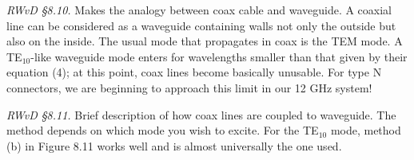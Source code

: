 \documentclass[11pt,preprint]{aastex}
\begin{document}
{\it RWvD \S 8.10.} Makes the analogy between coax cable and waveguide.
A coaxial line can be considered as a waveguide containing walls not
only the outside but also on the inside.  The usual mode that propagates
in coax is the TEM mode.  A TE$_{10}$-like waveguide mode enters for
wavelengths smaller than that given by their equation (4); at this
point, coax lines become basically unusable.  For type N connectors, we
are beginning to approach this limit in our 12 GHz system!

{\it RWvD \S 8.11.} Brief description of how coax lines are coupled to
waveguide. The method depends on which mode you wish to excite. For the
TE$_{10}$ mode, method (b) in Figure 8.11 works well and is almost
universally the one used.
\end{document}
